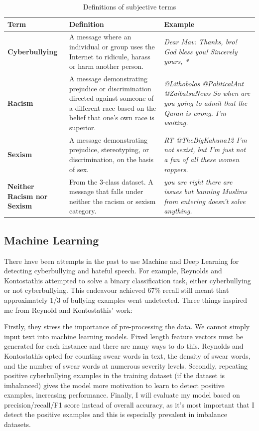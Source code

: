 \documentclass[12pt,a4paper]{article}
\begin{document}
\begin{table}[htb]
	\centering
	\caption{Definitions of subjective terms}
	\label{terms}
	\hspace*{-1.5cm}
	\begin{tabular}{p{2.8cm} p{8.0cm} p{7cm}} \hline\hline
		\textbf{Term} & \textbf{Definition} & \textbf{Example}  \\ \hline
		\textbf{Cyberbullying} & A message where an individual or group uses the Internet to ridicule, harass or harm another person. &  \textit{Dear Mav: Thanks, bro! God bless you!  Sincerely yours, *} \\ \hline
		\textbf{Racism} & A message demonstrating prejudice or discrimination directed against someone of a different race based on the belief that one's own race is superior. & \textit{@Lithobolos @PoliticalAnt @ZaibatsuNews So when are you going to admit that the Quran is wrong.  I'm waiting.} \\ \hline
		\textbf{Sexism} & A message demonstrating prejudice, stereotyping, or discrimination, on the basis of sex. & \textit{RT @TheBigKahuna12 I'm not sexist, but I'm just not a fan of all these women rappers.} \\ \hline
		\textbf{Neither Racism nor Sexism} & From the 3-class dataset. A message that falls under neither the racism or sexism category. & \textit{you are right there are issues but banning Muslims from entering doesn’t solve anything.}\\ \hline
		
	\end{tabular}
\end{table}

\subsection{Machine Learning}
There have been attempts in the past to use Machine and Deep Learning for detecting cyberbullying and hateful speech. For example, Reynolds and Kontostathis \citeyear[p.4]{Reynolds} attempted to solve a binary classification task, either cyberbullying or not cyberbullying. This endeavour achieved 67\% recall still meant that approximately 1/3 of bullying examples went undetected. Three things inspired me from Reynold and Kontostathis' \citeyear{Reynolds} work:

Firstly, they stress the importance of pre-processing the data. We cannot simply input text into machine learning models. Fixed length feature vectors must be generated for each instance and there are many ways to do this. Reynolds and Kontostathis opted for counting swear words in text, the density of swear words, and the number of swear words at numerous severity levels.  Secondly, repeating positive cyberbullying examples in the training dataset (if the dataset is imbalanced) gives the model more motivation to learn to detect positive examples, increasing performance. Finally, I will evaluate my model based on precision/recall/F1 score instead of overall accuracy, as it's most important that I detect the positive examples and this is especially prevalent in imbalance datasets.
\end{document}
